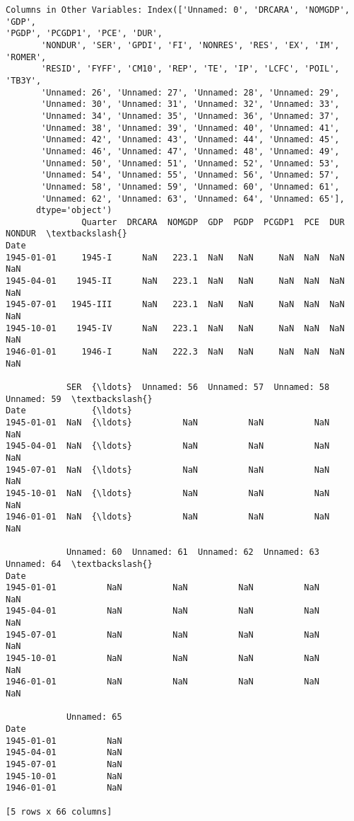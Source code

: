 \documentclass[11pt]{article}
\begin{document}
    \begin{Verbatim}[commandchars=\\\{\}]
Columns in Other Variables: Index(['Unnamed: 0', 'DRCARA', 'NOMGDP', 'GDP',
'PGDP', 'PCGDP1', 'PCE', 'DUR',
       'NONDUR', 'SER', 'GPDI', 'FI', 'NONRES', 'RES', 'EX', 'IM', 'ROMER',
       'RESID', 'FYFF', 'CM10', 'REP', 'TE', 'IP', 'LCFC', 'POIL', 'TB3Y',
       'Unnamed: 26', 'Unnamed: 27', 'Unnamed: 28', 'Unnamed: 29',
       'Unnamed: 30', 'Unnamed: 31', 'Unnamed: 32', 'Unnamed: 33',
       'Unnamed: 34', 'Unnamed: 35', 'Unnamed: 36', 'Unnamed: 37',
       'Unnamed: 38', 'Unnamed: 39', 'Unnamed: 40', 'Unnamed: 41',
       'Unnamed: 42', 'Unnamed: 43', 'Unnamed: 44', 'Unnamed: 45',
       'Unnamed: 46', 'Unnamed: 47', 'Unnamed: 48', 'Unnamed: 49',
       'Unnamed: 50', 'Unnamed: 51', 'Unnamed: 52', 'Unnamed: 53',
       'Unnamed: 54', 'Unnamed: 55', 'Unnamed: 56', 'Unnamed: 57',
       'Unnamed: 58', 'Unnamed: 59', 'Unnamed: 60', 'Unnamed: 61',
       'Unnamed: 62', 'Unnamed: 63', 'Unnamed: 64', 'Unnamed: 65'],
      dtype='object')
               Quarter  DRCARA  NOMGDP  GDP  PGDP  PCGDP1  PCE  DUR  NONDUR  \textbackslash{}
Date
1945-01-01     1945-I      NaN   223.1  NaN   NaN     NaN  NaN  NaN     NaN
1945-04-01    1945-II      NaN   223.1  NaN   NaN     NaN  NaN  NaN     NaN
1945-07-01   1945-III      NaN   223.1  NaN   NaN     NaN  NaN  NaN     NaN
1945-10-01    1945-IV      NaN   223.1  NaN   NaN     NaN  NaN  NaN     NaN
1946-01-01     1946-I      NaN   222.3  NaN   NaN     NaN  NaN  NaN     NaN

            SER  {\ldots}  Unnamed: 56  Unnamed: 57  Unnamed: 58  Unnamed: 59  \textbackslash{}
Date             {\ldots}
1945-01-01  NaN  {\ldots}          NaN          NaN          NaN          NaN
1945-04-01  NaN  {\ldots}          NaN          NaN          NaN          NaN
1945-07-01  NaN  {\ldots}          NaN          NaN          NaN          NaN
1945-10-01  NaN  {\ldots}          NaN          NaN          NaN          NaN
1946-01-01  NaN  {\ldots}          NaN          NaN          NaN          NaN

            Unnamed: 60  Unnamed: 61  Unnamed: 62  Unnamed: 63  Unnamed: 64  \textbackslash{}
Date
1945-01-01          NaN          NaN          NaN          NaN          NaN
1945-04-01          NaN          NaN          NaN          NaN          NaN
1945-07-01          NaN          NaN          NaN          NaN          NaN
1945-10-01          NaN          NaN          NaN          NaN          NaN
1946-01-01          NaN          NaN          NaN          NaN          NaN

            Unnamed: 65
Date
1945-01-01          NaN
1945-04-01          NaN
1945-07-01          NaN
1945-10-01          NaN
1946-01-01          NaN

[5 rows x 66 columns]
    \end{Verbatim}
\end{document}
